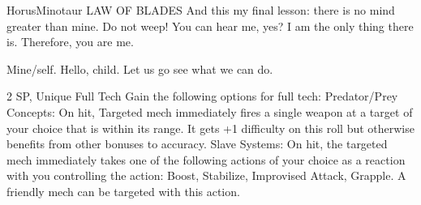 \begin{mech}{Horus}{Minotaur}
LAW OF BLADES
And this my final lesson: there is no mind greater than mine.
Do not weep! You can hear me, yes? I am the only thing there is. Therefore, you are me.

Mine/self. Hello, child. Let us go see what we can do.

2 SP, Unique
Full Tech
Gain the following options for full tech:
Predator/Prey Concepts: On hit, Targeted mech immediately fires a single weapon at a target of your choice that is within its range. It gets +1 difficulty on this roll but otherwise benefits from other bonuses to accuracy.
Slave Systems: On hit, the targeted mech immediately takes one of the following actions of your choice as a reaction with you controlling the action: Boost, Stabilize, Improvised Attack, Grapple. A friendly mech can be targeted with this action.


\end{mech}
